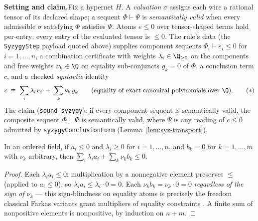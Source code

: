 

\textbf{Setting and claim.}\enspace Fix a hypernet $H$. A \emph{valuation}
$\sigma$ assigns each wire a rational tensor of its declared shape; a
sequent $\Phi \vdash \Psi$ is \emph{semantically valid} when every
admissible $\sigma$ satisfying $\Phi$ satisfies $\Psi$. Atoms
$e \leq 0$ over tensor-shaped terms hold per-entry: every entry of the
evaluated tensor is $\leq 0$. The rule's data (the \texttt{SyzygyStep}
payload quoted above) supplies component sequents
$\Phi_i \vdash e_i \leq 0$ for $i = 1,\dots,n$, a combination certificate
with weights $\lambda_i \in \Q_{\geq 0}$ on the components and free
weights $\nu_k \in \Q$ on equality sub-conjuncts $g_k = 0$ of $\Phi$, a
conclusion term $c$, and a checked \emph{syntactic} identity
\begin{equation}
c \;\equiv\; \sum_{i} \lambda_i\, e_i \;+\; \sum_{k} \nu_k\, g_k
\qquad\text{(equality of exact canonical polynomials over } \Q\text{).}
\tag{$\ast$}
\end{equation}
The claim (\texttt{sound\_syzygy}): if every component sequent is
semantically valid, the composite sequent $\Phi \vdash \Psi$ is
semantically valid, where $\Psi$ is any reading of $c \leq 0$ admitted by
\texttt{syzygyConclusionForm} (Lemma~\ref{lem:syz-transport}).

\begin{blemma}\label{lem:syz-comb}
In an ordered field, if $a_i \leq 0$ and $\lambda_i \geq 0$ for
$i = 1,\dots,n$, and $b_k = 0$ for $k = 1,\dots,m$ with $\nu_k$ arbitrary,
then $\sum_i \lambda_i a_i + \sum_k \nu_k b_k \leq 0$.
\end{blemma}
\begin{proof}
Each $\lambda_i a_i \leq 0$: multiplication by a nonnegative element
preserves $\leq$ (applied to $a_i \leq 0$), so
$\lambda_i a_i \leq \lambda_i \cdot 0 = 0$. Each $\nu_k b_k = \nu_k \cdot 0
= 0$ \emph{regardless of the sign of $\nu_k$} --- this sign-blindness on
equality atoms is precisely the freedom classical Farkas variants grant
multipliers of equality constraints \cite[\S7.3]{schrijver1986}. A finite
sum of nonpositive elements is nonpositive, by induction on $n + m$.
\end{proof}

